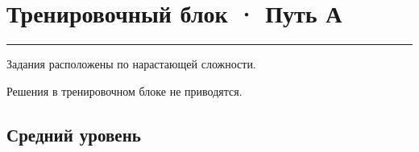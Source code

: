 \documentclass[a4paper,12pt]{article}
\newcommand{\sectionline}{
  \par
  \vspace{0.2em}
  \textcolor{lightline}{\rule{\linewidth}{0.8pt}}
  \par
  \vspace{0.35em}
}
\begin{document}

\clearpage

\section*{Тренировочный блок · Путь А}
\sectionline

Задания расположены по нарастающей сложности.

Решения в тренировочном блоке не приводятся.

\subsection*{Средний уровень}
\end{document}
